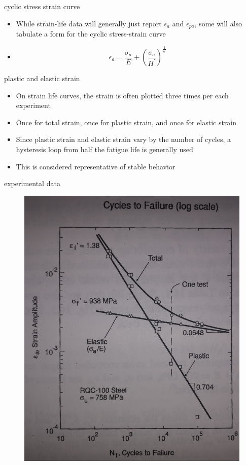 \documentclass[10pt]{beamer}
\begin{document}
\begin{frame}{cyclic stress strain curve}
	\begin{itemize}[<+->]
		\item While strain-life data will generally just report $\epsilon_a$ and $\epsilon_{pa}$, some will also tabulate a form for the cyclic stress-strain curve
		\item[] \begin{equation}
		\epsilon_a = \frac{\sigma_a}{E} + \left(\frac{\sigma_a}{H^\prime}\right)^{\frac{1}{n^\prime}}
		\end{equation}
	\end{itemize}
\end{frame}

\begin{frame}{plastic and elastic strain}
	\begin{itemize}[<+->]
		\item On strain life curves, the strain is often plotted three times per each experiment
		\item Once for total strain, once for plastic strain, and once for elastic strain
		\item Since plastic strain and elastic strain vary by the number of cycles, a hysteresis loop from half the fatigue life is generally used
		\item This is considered representative of stable behavior
	\end{itemize}
\end{frame}

\begin{frame}{experimental data}
	\begin{figure}
	\centering
	\includegraphics[width=0.5\linewidth]{../Figures/strain-life}
	\label{fig:strain-life}
	\end{figure}
\end{frame}
\end{document}
